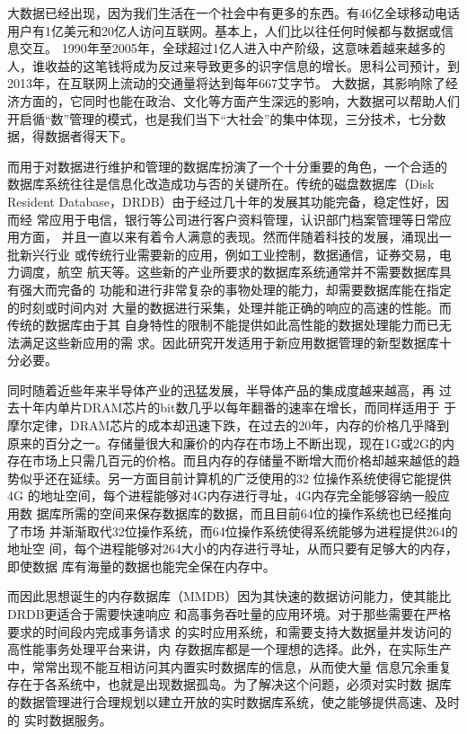\documentclass[proposal]{zjutreport}
\begin{document}
大数据已经出现，因为我们生活在一个社会中有更多的东西。有46亿全球移动电话用户有1亿美元和20亿人访问互联网。基本上，人们比以往任何时候都与数据或信息交互。 1990年至2005年，全球超过1亿人进入中产阶级，这意味着越来越多的人，谁收益的这笔钱将成为反过来导致更多的识字信息的增长。思科公司预计，到2013年，在互联网上流动的交通量将达到每年667艾字节。
大数据，其影响除了经济方面的，它同时也能在政治、文化等方面产生深远的影响，大数据可以帮助人们开启循“数”管理的模式，也是我们当下“大社会”的集中体现，三分技术，七分数据，得数据者得天下。

而用于对数据进行维护和管理的数据库扮演了一个十分重要的角色，一个合适的
数据库系统往往是信息化改造成功与否的关键所在。传统的磁盘数据库（Disk
Resident Database，DRDB）由于经过几十年的发展其功能完备，稳定性好，因而经
常应用于电信，银行等公司进行客户资料管理，认识部门档案管理等日常应用方面，
并且一直以来有着令人满意的表现。然而伴随着科技的发展，涌现出一批新兴行业
或传统行业需要新的应用，例如工业控制，数据通信，证券交易，电力调度，航空
航天等。这些新的产业所要求的数据库系统通常并不需要数据库具有强大而完备的
功能和进行非常复杂的事物处理的能力，却需要数据库能在指定的时刻或时间内对
大量的数据进行采集，处理并能正确的响应的高速的性能。而传统的数据库由于其
自身特性的限制不能提供如此高性能的数据处理能力而已无法满足这些新应用的需
求。因此研究开发适用于新应用数据管理的新型数据库十分必要。

同时随着近些年来半导体产业的迅猛发展，半导体产品的集成度越来越高，再
过去十年内单片DRAM芯片的bit数几乎以每年翻番的速率在增长，而同样适用于
于摩尔定律，DRAM芯片的成本却迅速下跌，在过去的20年，内存的价格几乎降到
原来的百分之一。存储量很大和廉价的内存在市场上不断出现，现在1G或2G的内
存在市场上只需几百元的价格。而且内存的存储量不断增大而价格却越来越低的趋
势似乎还在延续。另一方面目前计算机的广泛使用的32 位操作系统使得它能提供4G
的地址空间，每个进程能够对4G内存进行寻址，4G内存完全能够容纳一般应用数
据库所需的空间来保存数据库的数据，而且目前64位的操作系统也已经推向了市场
并渐渐取代32位操作系统，而64位操作系统使得系统能够为进程提供264的地址空
间，每个进程能够对264大小的内存进行寻址，从而只要有足够大的内存，即使数据
库有海量的数据也能完全保在内存中。

而因此思想诞生的内存数据库（MMDB）因为其快速的数据访问能力，使其能比DRDB更适合于需要快速响应
和高事务吞吐量的应用环境。对于那些需要在严格要求的时间段内完成事务请求
的实时应用系统，和需要支持大数据量并发访问的高性能事务处理平台来讲，内
存数据库都是一个理想的选择。此外，在实际生产中，常常出现不能互相访问其内置实时数据库的信息，从而使大量
信息冗余重复存在于各系统中，也就是出现数据孤岛。为了解决这个问题，必须对实时数
据库的数据管理进行合理规划以建立开放的实时数据库系统，使之能够提供高速、及时的
实时数据服务。
\end{document}
